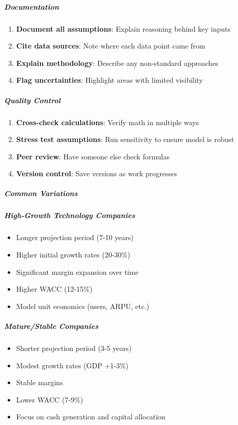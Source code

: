 \documentclass[11pt]{article}
\begin{document}
\subparagraph{Documentation}\mbox{}\par
\begin{enumerate}[leftmargin=*,itemsep=2pt,topsep=2pt]
\item {} \textbf{Document all assumptions}: Explain reasoning behind key inputs
\item {} \textbf{Cite data sources}: Note where each data point came from
\item {} \textbf{Explain methodology}: Describe any non-standard approaches
\item {} \textbf{Flag uncertainties}: Highlight areas with limited visibility
\end{enumerate}

\subparagraph{Quality Control}\mbox{}\par
\begin{enumerate}[leftmargin=*,itemsep=2pt,topsep=2pt]
\item {} \textbf{Cross-check calculations}: Verify math in multiple ways
\item {} \textbf{Stress test assumptions}: Run sensitivity to ensure model is robust
\item {} \textbf{Peer review}: Have someone else check formulas
\item {} \textbf{Version control}: Save versions as work progresses
\end{enumerate}

\subparagraph{Common Variations}\mbox{}\par

\subparagraph{High-Growth Technology Companies}\mbox{}\par
\begin{itemize}[leftmargin=*,itemsep=2pt,topsep=2pt]
\item {} Longer projection period (7-10 years)
\item {} Higher initial growth rates (20-30\%)
\item {} Significant margin expansion over time
\item {} Higher WACC (12-15\%)
\item {} Model unit economics (users, ARPU, etc.)
\end{itemize}

\subparagraph{Mature/Stable Companies}\mbox{}\par
\begin{itemize}[leftmargin=*,itemsep=2pt,topsep=2pt]
\item {} Shorter projection period (3-5 years)
\item {} Modest growth rates (GDP +1-3\%)
\item {} Stable margins
\item {} Lower WACC (7-9\%)
\item {} Focus on cash generation and capital allocation
\end{itemize}
\end{document}
